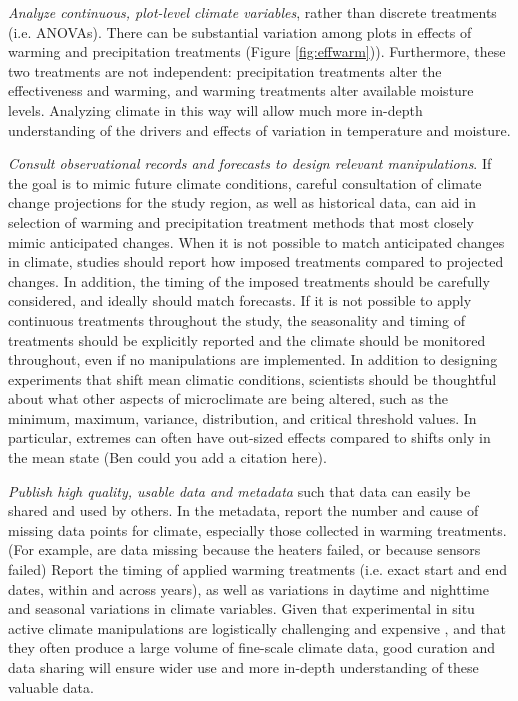 \documentclass{article}
\begin{document}
\par\textit{Analyze continuous, plot-level climate variables}, rather than discrete treatments (i.e. ANOVAs). There can be substantial variation among plots in effects of warming and precipitation treatments (Figure \ref{fig:effwarm})). Furthermore, these two treatments are not independent: precipitation treatments alter the effectiveness and warming, and warming treatments alter available moisture levels. Analyzing climate in this way will allow much more in-depth understanding of the drivers and effects of variation in temperature and moisture.
\par\textit{Consult observational records and forecasts to design relevant manipulations}. If the goal is to mimic future climate conditions, careful consultation of climate change projections for the study region, as well as historical data, can aid in selection of warming and precipitation treatment methods that most closely mimic anticipated changes. When it is not possible to match anticipated changes in climate, studies should report how imposed treatments compared to projected changes. In addition, the timing of the imposed treatments should be carefully considered, and ideally should match forecasts. If it is not possible to apply continuous treatments throughout the study, the seasonality and timing of treatments should be explicitly reported and the climate should be monitored throughout, even if no manipulations are implemented. In addition to designing experiments that shift mean climatic conditions, scientists should be thoughtful about what other aspects of microclimate are being altered, such as the minimum, maximum, variance, distribution, and critical threshold values. In particular, extremes can often have out-sized effects compared to shifts only in the mean state (Ben could you add a citation here).
\par\textit{Publish high quality, usable data and metadata} such that data can easily be shared and used by others. In the metadata, report the number and cause of missing data points for climate, especially those collected in warming treatments. (For example, are data missing because the heaters failed, or because sensors failed) Report the timing of applied warming treatments (i.e. exact start and end dates, within and across years), as well as variations in daytime and nighttime and seasonal variations in climate variables. Given that experimental in situ active climate  manipulations are logistically challenging  and expensive \citep{aronson2009}, and that they often produce a large volume of fine-scale climate data, good curation and data sharing will ensure wider use and more in-depth understanding of these valuable data. 
\end{document}
